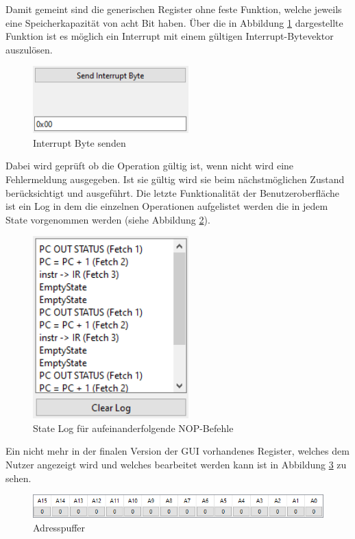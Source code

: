 \documentclass[12pt]{article}
\newcommand{\imgSpaceBefore}{\vspace{10pt}}
\begin{document}
\noindent
Damit gemeint sind die generischen Register ohne feste Funktion, welche jeweils eine Speicherkapazität von acht Bit haben. Über die in Abbildung \ref{fig:Interrupt} dargestellte Funktion ist es möglich ein Interrupt mit einem gültigen Interrupt-Bytevektor auszulösen.\imgSpaceBefore

\begin{figure}[h]
\centering
\includegraphics[width=6cm]{bilder/Interrupt}
\caption{Interrupt Byte senden}
\label{fig:Interrupt}
\end{figure}

\noindent
Dabei wird geprüft ob die Operation gültig ist, wenn nicht wird eine Fehlermeldung ausgegeben. Ist sie gültig wird sie beim nächstmöglichen Zustand berücksichtigt und ausgeführt.
\newpage
\noindent
Die letzte Funktionalität der Benutzeroberfläche ist ein Log in dem die einzelnen Operationen aufgelistet werden die in jedem State vorgenommen werden (siehe Abbildung \ref{fig:Logger}).\imgSpaceBefore

\begin{figure}[h]
\centering
\includegraphics[width=6cm]{bilder/Logger}
\caption{State Log für aufeinanderfolgende NOP-Befehle}
\label{fig:Logger}
\end{figure}

\noindent
Ein nicht mehr in der finalen Version der GUI vorhandenes Register, welches dem Nutzer angezeigt wird und welches bearbeitet werden kann ist in Abbildung \ref{fig:AddBuff} zu sehen.\imgSpaceBefore

\begin{figure}[h]
\centering
\includegraphics[width=15cm]{bilder/AddBuff}
\caption{Adresspuffer}
\label{fig:AddBuff}
\end{figure}
\end{document}
